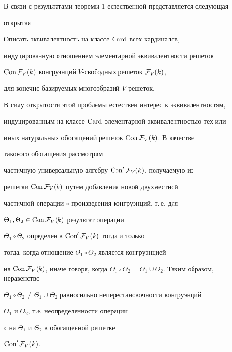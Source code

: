 В связи с результатами теоремы 1 естественной представляется следующая


открытая





\begin{probnonum}


Описать эквивалентность на классе $\operatorname{Card}$ всех кардиналов,


индуцированную отношением элементарной эквивалентности решеток


$\operatorname{Con}{\cal F}_V(k)$ конгруэнций $V$-свободных решеток ${\cal F}_V(k)$,


для конечно базируемых многообразий $V$ решеток.


\end{probnonum}





В силу открытости этой проблемы естествен интерес к эквивалентностям,


индуцированным на классе $\operatorname{Card}$ элементарной эквивалентностью тех или


иных натуральных обогащений решеток $\operatorname{Con}{\cal F}_V(k)$. В качестве


такового обогащения рассмотрим


частичную универсальную алгебру $\operatorname{Con} '{\cal F}_V(k)$, получаемую из


решетки $\operatorname{Con}{\cal F}_V(k)$ путем добавления новой двухместной


частичной операции $\circ$-произведения конгруэнций, т.\,е. для 


$\Theta_1,\Theta_2\in \operatorname{Con}{\cal F}_V(k)$ результат операции


$\Theta_1\circ\Theta_2$ определен в $\operatorname{Con} '{\cal F}_V(k)$ тогда и только


тогда, когда отношение $\Theta_1\circ\Theta_2$ является конгруэнцией


на $\Con{\cal F}_V(k)$, иначе говоря, когда $\Theta_1\circ\Theta_2=


\Theta_1\cup\Theta_2$. Таким образом, неравенство


$\Theta_1\circ\Theta_2\neq


\Theta_1\cup\Theta_2$ равносильно неперестановочности конгруэнций


$\Theta_1$ и $\Theta_2$, т.е. неопределенности операции 


$\circ$ на $\Theta_1$ и $\Theta_2$ в обогащенной решетке 


$\operatorname{Con} '{\cal F}_V(k)$.





